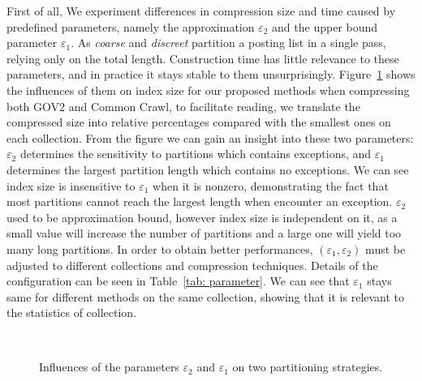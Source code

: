 \documentclass[runningheads,a4paper]{llncs}
\begin{document}
First of all, We experiment differences in compression size and time caused by predefined parameters, namely the approximation $\varepsilon_{2}$ and the upper bound parameter $\varepsilon_{1}$.
As \textit{coarse} and \textit{discreet} partition a posting list in a single pass, relying only on the total length.
Construction time has little relevance to these parameters, and in practice it stays stable to them unsurprisingly.
Figure~\ref{fig:parameter} shows the influences of them on index size for our proposed methods when compressing both GOV2 and Common Crawl, to facilitate reading, we translate the compressed size into relative percentages compared with the smallest ones on each collection.
From the figure we can gain an insight into these two parameters: $\varepsilon_{2}$ determines the sensitivity to partitions which contains exceptions, and $\varepsilon_{1}$ determines the largest partition length which contains no exceptions.
We can see index size is insensitive to $\varepsilon_{1}$ when it is nonzero, demonstrating the fact that most partitions cannot reach the largest length when encounter an exception.
$\varepsilon_{2}$ used to be approximation bound, however index size is independent on it, as a small value will increase the number of partitions and a large one will yield too many long partitions.
In order to obtain better performances, $ \left( \varepsilon_1,\varepsilon_2 \right) $ must be adjusted to different collections and compression techniques.
Details of the configuration can be seen in Table~\ref{tab: parameter}.
We can see that $ \varepsilon_1 $ stays same for different methods on the same collection, showing that it is relevant to the statistics of collection.

\begin{figure}
	\centering
	\\

	\caption{Influences of the parameters $\varepsilon_{2}$ and $\varepsilon_{1}$ on two partitioning strategies.}
	\label{fig:parameter}
\end{figure}
\end{document}
